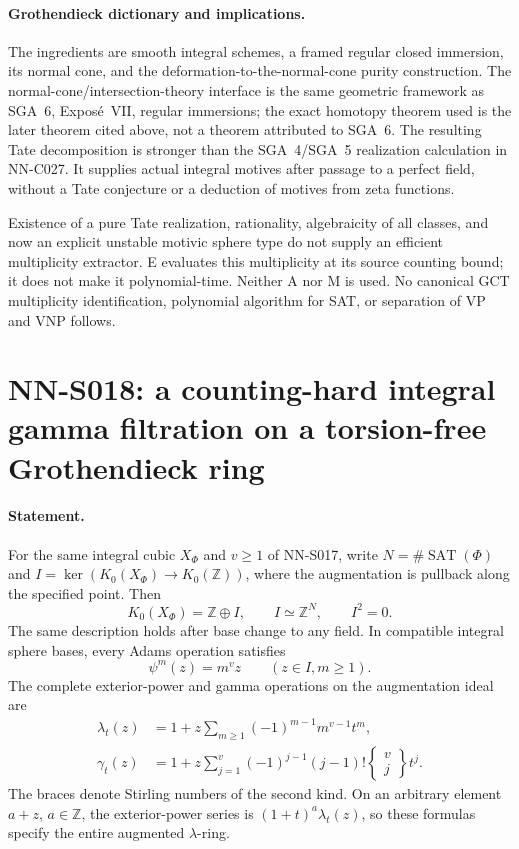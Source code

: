\paragraph{Grothendieck dictionary and implications.}
The ingredients are smooth integral schemes, a framed regular closed
immersion, its normal cone, and the deformation-to-the-normal-cone
purity construction. The normal-cone/intersection-theory interface is
the same geometric framework as SGA~6, Expos\'e~VII, regular immersions;
the exact homotopy theorem used is the later theorem cited above, not
a theorem attributed to SGA~6. The resulting Tate decomposition is
stronger than the SGA~4/SGA~5 realization calculation in NN-C027.
It supplies actual integral motives after passage to a perfect field,
without a Tate conjecture or a deduction of motives from zeta functions.

Existence of a pure Tate realization, rationality, algebraicity of all
classes, and now an explicit unstable motivic sphere type do not supply
an efficient multiplicity extractor. E evaluates this multiplicity at
its source counting bound; it does not make it polynomial-time.
Neither A nor M is used. No canonical GCT multiplicity identification,
polynomial algorithm for SAT, or separation of VP and VNP follows.



\section{NN-S018: a counting-hard integral gamma filtration on a torsion-free Grothendieck ring}

\paragraph{Statement.}
For the same integral cubic $X_\Phi$ and $v\ge1$ of NN-S017, write
$N=\#\operatorname{SAT}(\Phi)$ and $I=\ker(K_0(X_\Phi)\to K_0(\mathbb Z))$,
where the augmentation is pullback along the specified point. Then
\begin{equation}\label{eq:S018-ring}
 K_0(X_\Phi)=\mathbb Z\oplus I,\qquad I\simeq\mathbb Z^N,\qquad I^2=0.
\end{equation}
The same description holds after base change to any field. In compatible
integral sphere bases, every Adams operation satisfies
\[
                  \psi^m(z)=m^v z\qquad (z\in I, m\ge1).
\]
The complete exterior-power and gamma operations on the augmentation
ideal are
\begin{align}
 \lambda_t(z)&=1+z\sum_{m\ge1}(-1)^{m-1}m^{v-1}t^m,
                                                    \label{eq:S018-lambda}\\
 \gamma_t(z)&=1+z\sum_{j=1}^{v}(-1)^{j-1}(j-1)!
                       \left\{\begin{matrix}v\\j\end{matrix}\right\}t^j.
                                                    \label{eq:S018-gamma}
\end{align}
The braces denote Stirling numbers of the second kind. On an arbitrary
element $a+z$, $a\in\mathbb Z$, the exterior-power series is
$(1+t)^a\lambda_t(z)$, so these formulas specify the entire augmented
$\lambda$-ring.

